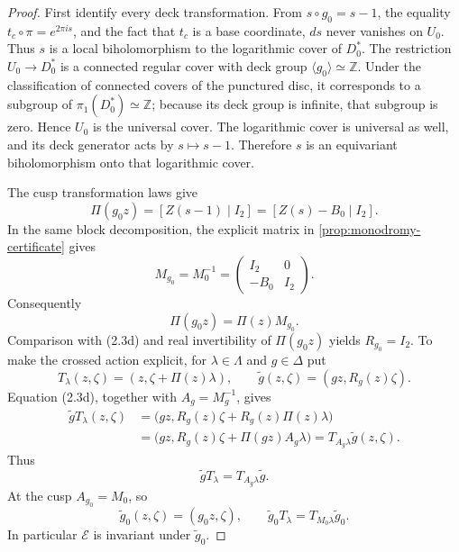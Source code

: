 \begin{proof}
First identify every deck transformation.  From
\(s\circ g_0=s-1\), the equality
\(t_c\circ\pi=e^{2\pi is}\), and the fact that \(t_c\) is a base
coordinate, \(ds\) never vanishes on \(U_0\).  Thus \(s\) is a local
biholomorphism to the logarithmic cover of \(D_0^*\).  The restriction
\(U_0\to D_0^*\) is a connected regular cover with deck group
\(\langle g_0\rangle\simeq\mathbb Z\).  Under the classification of connected
covers of the punctured disc, it corresponds to a subgroup of
\(\pi_1(D_0^*)\simeq\mathbb Z\); because its deck group is infinite, that
subgroup is zero.  Hence \(U_0\) is the universal cover.  The logarithmic
cover is universal as well, and its deck generator acts by
\(s\mapsto s-1\).  Therefore \(s\) is an equivariant biholomorphism onto that
logarithmic cover.

The cusp transformation laws give
\[
 \Pi(g_0z)=[Z(s-1)\mid I_2]=[Z(s)-B_0\mid I_2].
\]
In the same block decomposition, the explicit matrix in
\cref{prop:monodromy-certificate} gives
\[
 M_{g_0}=M_0^{-1}
 =\begin{pmatrix}I_2&0\\-B_0&I_2\end{pmatrix}.
\]
Consequently
\[
 \Pi(g_0z)=\Pi(z)M_{g_0}.
\]
Comparison with (2.3d) and real invertibility of \(\Pi(g_0z)\) yields
\(R_{g_0}=I_2\).  To make the crossed action explicit, for
\(\lambda\in\Lambda\) and \(g\in\Delta\) put
\[
 T_\lambda(z,\zeta)=(z,\zeta+\Pi(z)\lambda),
 \qquad
 \widetilde g(z,\zeta)=(gz,R_g(z)\zeta).
\]
Equation (2.3d), together with \(A_g=M_g^{-1}\), gives
\[
\begin{aligned}
 \widetilde gT_\lambda(z,\zeta)
 &=\bigl(gz,R_g(z)\zeta+R_g(z)\Pi(z)\lambda\bigr)\\
 &=\bigl(gz,R_g(z)\zeta+\Pi(gz)A_g\lambda\bigr)
  =T_{A_g\lambda}\widetilde g(z,\zeta).
\end{aligned}
\]
Thus
\[
 \widetilde gT_\lambda=T_{A_g\lambda}\widetilde g.
\tag{2.8ii-a}
\]
At the cusp \(A_{g_0}=M_0\), so
\[
 \widetilde g_0(z,\zeta)=(g_0z,\zeta),
 \qquad
 \widetilde g_0T_\lambda=T_{M_0\lambda}\widetilde g_0.
\tag{2.8ii-b}
\]
In particular \(\mathcal E\) is invariant under \(\widetilde g_0\).


\end{proof}
